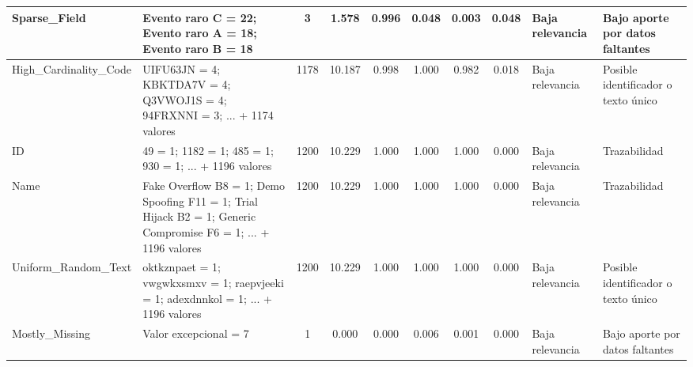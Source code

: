 \begin{table}[h]
\begin{tabular}{|p{2.1cm}|p{3.0cm}|c|c|c|c|c|c|p{2.5cm}|p{2.8cm}|}
\hline
Sparse\_Field & Evento raro C = 22; Evento raro A = 18; Evento raro B = 18 & 3 & 1.578 & 0.996 & 0.048 & 0.003 & 0.048 & Baja relevancia & Bajo aporte por datos faltantes \\
\hline
High\_Cardinality\_Code & UIFU63JN = 4; KBKTDA7V = 4; Q3VWOJ1S = 4; 94FRXNNI = 3; ... + 1174 valores & 1178 & 10.187 & 0.998 & 1.000 & 0.982 & 0.018 & Baja relevancia & Posible identificador o texto único \\
\hline
ID & 49 = 1; 1182 = 1; 485 = 1; 930 = 1; ... + 1196 valores & 1200 & 10.229 & 1.000 & 1.000 & 1.000 & 0.000 & Baja relevancia & Trazabilidad \\
\hline
Name & Fake Overflow B8 = 1; Demo Spoofing F11 = 1; Trial Hijack B2 = 1; Generic Compromise F6 = 1; ... + 1196 valores & 1200 & 10.229 & 1.000 & 1.000 & 1.000 & 0.000 & Baja relevancia & Trazabilidad \\
\hline
Uniform\_Random\_Text & oktkznpaet = 1; vwgwkxsmxv = 1; raepvjeeki = 1; adexdnnkol = 1; ... + 1196 valores & 1200 & 10.229 & 1.000 & 1.000 & 1.000 & 0.000 & Baja relevancia & Posible identificador o texto único \\
\hline
Mostly\_Missing & Valor excepcional = 7 & 1 & 0.000 & 0.000 & 0.006 & 0.001 & 0.000 & Baja relevancia & Bajo aporte por datos faltantes \\
\hline
\end{tabular}
\end{table}

